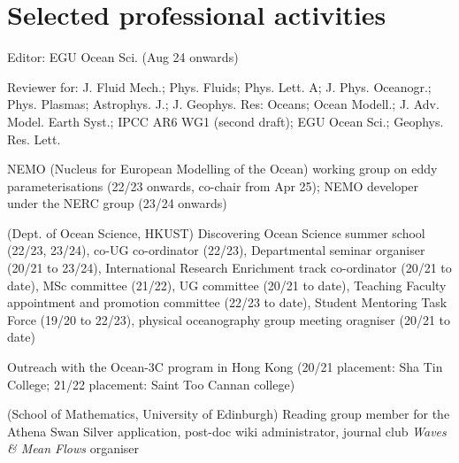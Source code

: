 \documentclass[letterpaper]{article}
\renewenvironment{itemize}{
  \begin{list}{}{
    \setlength{\leftmargin}{1.5em}
  }
}{
  \end{list}
}
\begin{document}
\section*{Selected professional activities}
\begin{itemize}

\item[--] Editor: EGU Ocean Sci. (Aug 24 onwards)

\item[--] Reviewer for: J. Fluid Mech.; Phys. Fluids; Phys. Lett. A; J. Phys.
Oceanogr.; Phys. Plasmas; Astrophys. J.; J. Geophys. Res: Oceans; Ocean Modell.;
J. Adv. Model. Earth Syst.; IPCC AR6 WG1 (second draft); EGU Ocean Sci.; Geophys. Res. Lett.

\item[--] NEMO (Nucleus for European Modelling of the Ocean) working group on
eddy parameterisations (22/23 onwards, co-chair from Apr 25); NEMO developer under the NERC group
(23/24 onwards)

\item[--] (Dept. of Ocean Science, HKUST) Discovering Ocean Science summer
school (22/23, 23/24), co-UG co-ordinator (22/23), Departmental seminar
organiser (20/21 to 23/24), International Research Enrichment track co-ordinator
(20/21 to date), MSc committee (21/22), UG committee (20/21 to date), Teaching
Faculty appointment and promotion committee (22/23 to date), Student Mentoring
Task Force (19/20 to 22/23), physical oceanography group meeting oragniser
(20/21 to date)

\item[--] Outreach with the Ocean-3C program in Hong Kong (20/21 placement: Sha
Tin College; 21/22 placement: Saint Too Cannan college)

\item[--] (School of Mathematics, University of Edinburgh) Reading group member
for the Athena Swan Silver application, post-doc wiki administrator, journal
club \textit{Waves \& Mean Flows} organiser 

\end{itemize}

\end{document}
